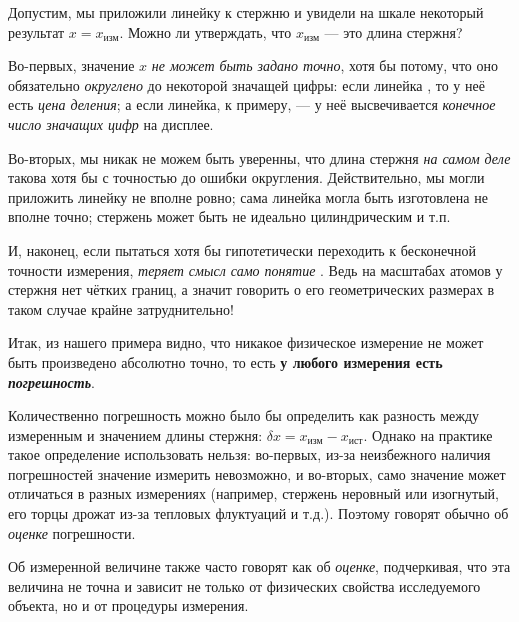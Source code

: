 Допустим, мы приложили линейку к стержню и увидели на шкале некоторый результат
$x=x_{\text{изм}}$. Можно ли утверждать, что $x_{\text{изм}}$ --- это длина
стержня?

Во-первых, значение $x$ \emph{не может быть задано точно}, хотя бы
потому, что оно обязательно \emph{округлено} до некоторой значащей
цифры: если линейка , то у неё
есть \emph{цена деления}; а если линейка, к примеру, 
--- у неё высвечивается \emph{конечное число значащих цифр}
на дисплее.

Во-вторых, мы никак не можем быть уверенны, что длина стержня \emph{на
самом деле} такова хотя бы с точностью до ошибки округления. Действительно,
мы могли приложить линейку не вполне ровно; сама линейка могла быть
изготовлена не вполне точно; стержень может быть не идеально цилиндрическим
и т.п.

И, наконец, если пытаться хотя бы гипотетически переходить к бесконечной
точности измерения, \emph{теряет смысл само понятие} . Ведь
на масштабах атомов у стержня нет чётких границ, а значит говорить о его
геометрических размерах в таком случае крайне затруднительно!

Итак, из нашего примера видно, что никакое физическое измерение не может быть
произведено абсолютно точно, то есть
\textbf{у любого измерения есть \emph{погрешность}}.%

Количественно погрешность можно было бы определить как разность между
измеренным и  значением длины стержня:
$\delta x=x_{\text{изм}}-x_{\text{ист}}$. Однако на практике такое определение
использовать нельзя: во-первых, из-за неизбежного наличия
погрешностей  значение измерить невозможно, и во-вторых, само
 значение может отличаться в разных измерениях (например, стержень
неровный или изогнутый, его торцы дрожат из-за тепловых флуктуаций и т.д.).
Поэтому говорят обычно об \emph{оценке} погрешности.

Об измеренной величине также часто говорят как об \emph{оценке}, подчеркивая,
что эта величина не точна и зависит не только от физических свойства
исследуемого объекта, но и от процедуры измерения.

